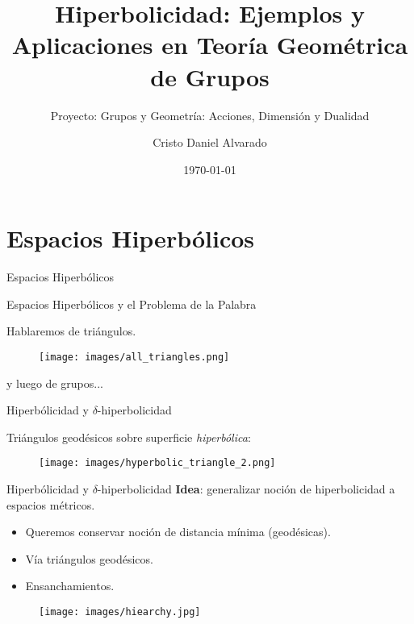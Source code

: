 \documentclass[xcolor=dvipsnames,aspectratio=159]{beamer}
\subtitle{Proyecto: Grupos y Geometría: Acciones, Dimensión y Dualidad}
\title{Hiperbolicidad: Ejemplos y Aplicaciones en Teoría Geométrica de Grupos}
\author{Cristo Daniel Alvarado}
\institute
{
    Escuela Superior de Física y Matemáticas \\
    Instituto Politécnico Nacional
}
\date{\today} %
\theoremstyle{largebreak}
\begin{document}
\begin{frame}
    \titlepage
\end{frame}

\section{Espacios Hiperbólicos}

\begin{frame}{Espacios Hiperbólicos}
    \begin{center}
        \LARGE{Espacios Hiperbólicos y el Problema de la Palabra}
    \end{center}

    \pause

    \begin{center}
        Hablaremos de triángulos.
    \end{center}
    \begin{figure}
        \begin{center}
            \texttt{[image: images/all\_triangles.png]}
        \end{center}
    \end{figure}
    \begin{center}
        y luego de grupos... 
    \end{center}

\end{frame}

\begin{frame}{Hiperbólicidad y $\delta$-hiperbolicidad}
    \begin{center}
        Triángulos geodésicos sobre superficie \textit{hiperbólica}:
    \end{center}
    \begin{figure}
        \begin{center}
            \texttt{[image: images/hyperbolic\_triangle\_2.png]}
        \end{center}
    \end{figure}
\end{frame}

\begin{frame}{Hiperbólicidad y $\delta$-hiperbolicidad}
    \textbf{Idea}: generalizar noción de hiperbolicidad a espacios métricos.
    \begin{itemize}
        \item Queremos conservar noción de distancia mínima (geodésicas).
        \item Vía triángulos geodésicos.
        \item Ensanchamientos.
    \end{itemize}

    \pause
    \begin{figure}
        \begin{center}
            \texttt{[image: images/hiearchy.jpg]}
        \end{center}
    \end{figure}
\end{frame}
\end{document}
